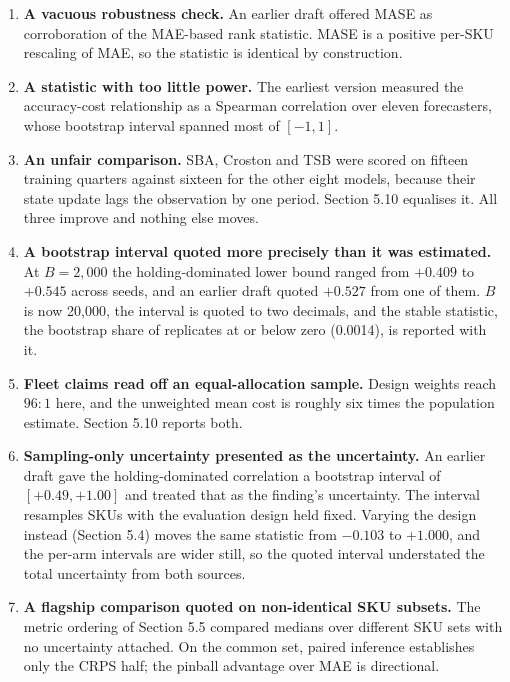 \documentclass[11pt]{article}
\begin{document}
\begin{enumerate}
  deployed policy was beaten by every model-driven policy. LightGBM does not
  beat it.
\item \textbf{A vacuous robustness check.} An earlier draft offered MASE as
  corroboration of the MAE-based rank statistic. MASE is a positive per-SKU
  rescaling of MAE, so the statistic is identical by construction.
\item \textbf{A statistic with too little power.} The earliest version measured
  the accuracy-cost relationship as a Spearman correlation over eleven
  forecasters, whose bootstrap interval spanned most of $[-1, 1]$.
\item \textbf{An unfair comparison.} SBA, Croston and TSB were scored on
  fifteen training quarters against sixteen for the other eight models, because
  their state update lags the observation by one period. Section 5.10 equalises
  it. All three improve and nothing else moves.
\item \textbf{A bootstrap interval quoted more precisely than it was
  estimated.} At $B = 2{,}000$ the holding-dominated lower bound ranged from
  $+0.409$ to $+0.545$ across seeds, and an earlier draft quoted $+0.527$ from
  one of them. $B$ is now 20{,}000, the interval is quoted to two decimals, and
  the stable statistic, the bootstrap share of replicates at or below zero
  (0.0014), is reported with it.
\item \textbf{Fleet claims read off an equal-allocation sample.} Design weights
  reach $96 : 1$ here, and the unweighted mean cost is roughly six times the
  population estimate. Section 5.10 reports both.
\item \textbf{Sampling-only uncertainty presented as the uncertainty.} An
  earlier draft gave the holding-dominated correlation a bootstrap interval of
  $[+0.49, +1.00]$ and treated that as the finding's uncertainty. The interval
  resamples SKUs with the evaluation design held fixed. Varying the design
  instead (Section 5.4) moves the same statistic from $-0.103$ to $+1.000$,
  and the per-arm intervals are wider still, so the quoted interval
  understated the total uncertainty from both sources.
\item \textbf{A flagship comparison quoted on non-identical SKU subsets.} The
  metric ordering of Section 5.5 compared medians over different SKU sets with
  no uncertainty attached. On the common set, paired inference establishes
  only the CRPS half; the pinball advantage over MAE is directional.
\end{enumerate}
\end{document}
